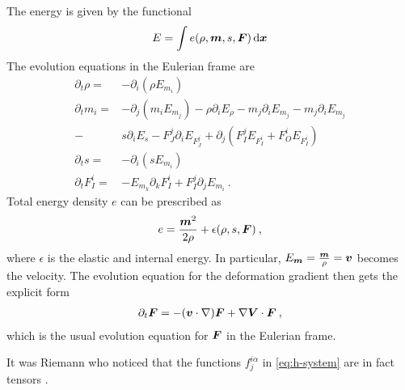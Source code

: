 \begin{example}
    The energy is given by the functional
    \begin{align}
        E = \int e(\rho, \boldsymbol{m}, s, \boldsymbol{F}) \, \mathrm{d} \boldsymbol{x}
    \end{align}
    The evolution equations in the Eulerian frame are
    \begin{align}
        \partial_t \rho =& - \partial_i (\rho E_{m_i}) 
        \\
        \partial_t m_i =& - \partial_j(m_i E_{m_j}) - \rho \partial_i E_\rho - m_j \partial_i E_{m_j} - m_j \partial_i E_{m_j} 
        \\
        -& s \partial_i E_s - F^j_J \partial_i E_{F^j_J} + \partial_j(F^j_I E_{F^i_I} + F^i_O E_{F^i_I}) 
        \\
        \partial_t s =& - \partial_i (sE_{m_i})
        \\
        \partial_t F^i_I =& - E_{m_k} \partial_k F^i_I + F^j_I \partial_j E_{m_i} \:.
    \end{align}
    Total energy density $e$ can be prescribed as
    \begin{align}
        e = \frac{\boldsymbol{m}^2}{2 \rho} + \epsilon(\rho,s , \boldsymbol{F}) \:,
    \end{align}
    where $\epsilon$ is the elastic and internal energy. In particular, $E_{\boldsymbol{m}} = \frac{\boldsymbol{m}}{\rho} = \boldsymbol{v}$ becomes the velocity. The evolution equation for the deformation gradient then gets the explicit form
    \begin{align}
        \partial_t \boldsymbol{F} = -(\boldsymbol{v} \cdot \nabla) \boldsymbol{F} + \nabla \boldsymbol{V} \cdot \boldsymbol{F} \:,
    \end{align}
    which is the usual evolution equation for $\boldsymbol{F}$ in the Eulerian frame.
\end{example}

It was Riemann who noticed that the functions $f^{i \alpha}_j$ in \eqref{eq:h-system} are in fact tensors \cite{Dubrovin-Novikov}.

